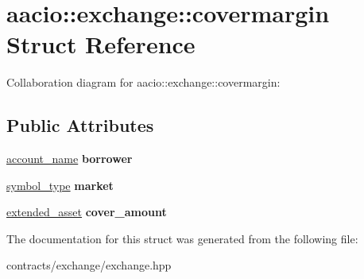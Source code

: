 \hypertarget{structaacio_1_1exchange_1_1covermargin}{}\section{aacio\+:\+:exchange\+:\+:covermargin Struct Reference}
\label{structaacio_1_1exchange_1_1covermargin}


Collaboration diagram for aacio\+:\+:exchange\+:\+:covermargin\+:
\subsection*{Public Attributes}
\begin{DoxyCompactItemize}
\item 
\mbox{\label{structaacio_1_1exchange_1_1covermargin_ad31b5831ef741e346d33b65b142b5549}} 
\mbox{\hyperlink{structaacio_1_1chain_1_1name}{account\+\_\+name}} {\bfseries borrower}
\item 
\mbox{\label{structaacio_1_1exchange_1_1covermargin_af7b2aad7a512395345e0b93678ea8481}} 
\mbox{\hyperlink{structaacio_1_1symbol__type}{symbol\+\_\+type}} {\bfseries market}
\item 
\mbox{\label{structaacio_1_1exchange_1_1covermargin_a66cfc646bdb3e4064b0685929b9091da}} 
\mbox{\hyperlink{structaacio_1_1extended__asset}{extended\+\_\+asset}} {\bfseries cover\+\_\+amount}
\end{DoxyCompactItemize}


The documentation for this struct was generated from the following file\+:\begin{DoxyCompactItemize}
\item 
contracts/exchange/exchange.\+hpp\end{DoxyCompactItemize}
